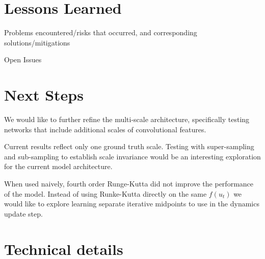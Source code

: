 \documentclass[12pt]{article}
\theoremstyle{plain}
\theoremstyle{remark}
\theoremstyle{definition}
\begin{document}
\section{Lessons Learned}


\noindent Problems encountered/risks that occurred, and corresponding solutions/mitigations

\noindent Open Issues

\section{Next Steps}

\noindent We would like to further refine the multi-scale architecture, specifically testing networks that include additional scales of convolutional features.


\noindent Current results reflect only one ground truth scale. Testing with super-sampling and sub-sampling to establish scale invariance would be an interesting exploration for the current model architecture.

\noindent When used naively, fourth order Runge-Kutta did not improve the performance of the model. Instead of using Runke-Kutta directly on the same $f(u_t)$ we would like to explore learning separate iterative midpoints to use in the dynamics update step.  


\section{Technical details}
\end{document}
